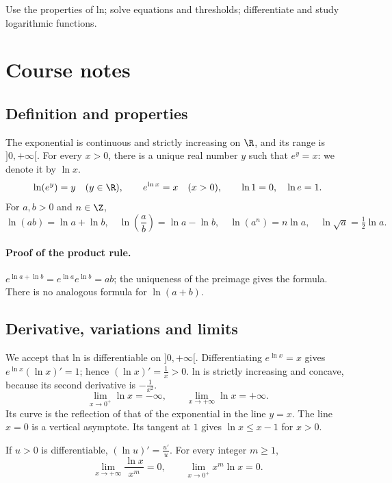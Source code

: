\label{ch:6}


\begin{keypoint}[Objectives]Use the properties of ln; solve equations and thresholds; differentiate and study logarithmic functions.\end{keypoint}

\section{Course notes}
\subsection{Definition and properties}
The exponential is continuous and strictly increasing on $\R$, and its range is $]0,+\infty[$. For every $x>0$, there is a unique real number $y$ such that $e^y=x$: we denote it by $\ln x$.
\[\ln(e^y)=y\quad(y\in\R),\qquad e^{\ln x}=x\quad(x>0),\qquad\ln1=0,\quad\ln e=1.\]
For $a,b>0$ and $n\in\Z$,
\[\ln (ab)=\ln a+\ln b,\quad\ln (\frac{a}{b})=\ln a-\ln b,\quad\ln (a^n)=n\ln a,\quad\ln \sqrt{a}=\tfrac{1}{2}\ln a.\]
\paragraph{Proof of the product rule.} $e^{\ln a+\ln b}=e^{\ln a}e^{\ln b}=ab$; the uniqueness of the preimage gives the formula. There is no analogous formula for $\ln(a+b)$.
\subsection{Derivative, variations and limits}
We accept that ln is differentiable on $]0,+\infty[$. Differentiating $e^{\ln x}=x$ gives $e^{\ln x}(\ln x)'=1$; hence $(\ln x)'=\frac{1}{x}>0$. ln is strictly increasing and concave, because its second derivative is $-\frac{1}{x^2}$.
\[\lim_{x\to0^+}\ln x=-\infty,\qquad\lim_{x\to+\infty}\ln x=+\infty.\]
Its curve is the reflection of that of the exponential in the line $y=x$. The line $x=0$ is a vertical asymptote. Its tangent at $1$ gives $\ln x\le x-1$ for $x>0$.
\begin{keypoint}
If $u>0$ is differentiable, $(\ln u)'=\frac{u'}{u}$. For every integer $m\ge1$,
\[\lim_{x\to+\infty}\frac{\ln x}{x^m}=0,\qquad\lim_{x\to0^+}x^m\ln x=0.\]
\end{keypoint}
